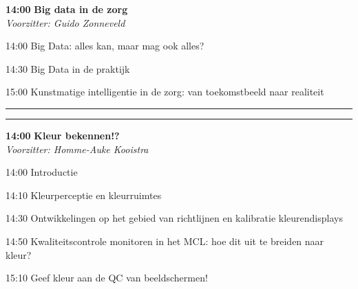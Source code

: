 \documentclass[a4paper,10pt]{report}
\begin{document}
\begin{multicols*}{3}
\vfill

\begin{packed_enum}
\item[\textbf{14:00}] \textbf{Big data in de zorg}\\\textit{Voorzitter: Guido Zonneveld}
\item[14:00] Big Data: alles kan, maar mag ook alles?
\item[14:30] Big Data in de praktijk
\item[15:00] Kunstmatige intelligentie in de zorg: van toekomstbeeld naar realiteit
\end{packed_enum} %

\columnbreak

\hrule \vspace{2mm}
\vspace{2mm}\hrule\strut

\begin{packed_enum}
\item[\textbf{14:00}] \textbf{Kleur bekennen!?}\\\textit{Voorzitter: Homme-Auke Kooistra}
\item[14:00] Introductie
\item[14:10] Kleurperceptie en kleurruimtes
\item[14:30] Ontwikkelingen op het gebied van richtlijnen en kalibratie kleurendisplays
\item[14:50] Kwaliteitscontrole monitoren in het MCL: hoe dit uit te breiden naar kleur?
\item[15:10] Geef kleur aan de QC van beeldschermen!
\end{packed_enum} %

\vfill



\end{multicols*}
\end{document}
